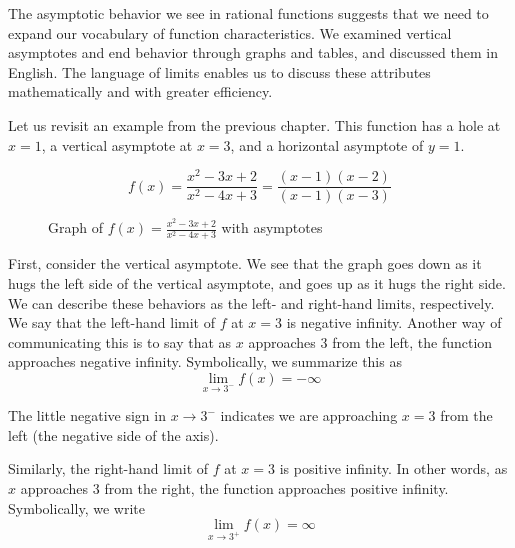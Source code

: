 The asymptotic behavior we see in rational functions suggests that we need to
expand our vocabulary of function characteristics. We examined vertical
asymptotes and end behavior through graphs and tables, and discussed them in
English. The language of limits enables us to discuss these attributes 
mathematically and with greater efficiency. 

Let us revisit an example from the previous chapter. This function has a hole 
at $ x = 1 $, a vertical asymptote at $ x = 3 $, and a horizontal asymptote of 
$ y = 1 $.

$$ f(x) = \frac{x^2 - 3x + 2}{x^2 - 4x + 3} = \frac{(x-1)(x-2)}{(x-1)(x-3)} $$

\begin{figure}[H]
  \centering
  \caption{Graph of \( f(x) = \frac{x^2 - 3x + 2}{x^2 - 4x + 3} \) with 
  asymptotes}
\end{figure}

First, consider the vertical asymptote. We see that the graph goes down as it 
hugs the left side of the vertical asymptote, and goes up as it hugs the right 
side. We can describe these behaviors as the left- and right-hand limits, 
respectively. We say that the left-hand limit of $ f $ at $ x = 3 $ is 
negative infinity. Another way of communicating this is to say that as $ x $ 
approaches $ 3 $ from the left, the function approaches negative infinity. 
Symbolically, we summarize this as 
$$ \lim_{x \rightarrow 3^-} f(x) = -\infty $$

The little negative sign in $x \rightarrow 3^-$ indicates we are approaching 
$x = 3$ from the left (the negative side of the axis). 

Similarly, the right-hand limit of $ f $ at $ x = 3 $ is positive infinity. In 
other words, as $ x $ approaches $ 3 $ from the right, the function approaches 
positive infinity. Symbolically, we write 
$$ \lim_{x \rightarrow 3^+} f(x) = \infty $$

